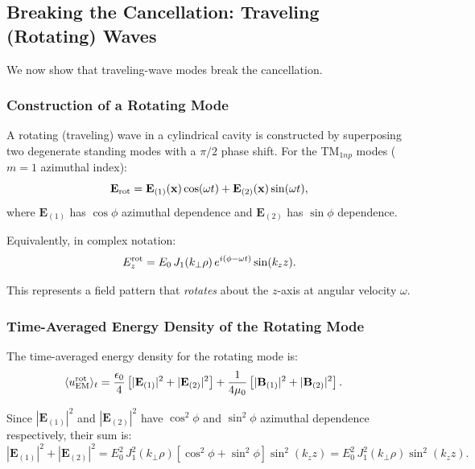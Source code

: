 \documentclass[aps,prd,twocolumn,superscriptaddress,floatfix,nofootinbib]{revtex4-2}
\begin{document}
\subsection{Breaking the Cancellation: Traveling (Rotating) Waves}
\label{sec:traveling-wave}

We now show that traveling-wave modes break the cancellation.

\subsubsection{Construction of a Rotating Mode}

A rotating (traveling) wave in a cylindrical cavity is constructed
by superposing two degenerate standing modes with a $\pi/2$ phase
shift. For the TM$_{1np}$ modes ($m = 1$ azimuthal index):
\begin{equation}
\mathbf{E}_{\rm rot} = \mathbf{E}_{(1)}(\mathbf{x})\cos(\omega t)
+ \mathbf{E}_{(2)}(\mathbf{x})\sin(\omega t),
\label{eq:rotating-mode}
\end{equation}
where $\mathbf{E}_{(1)}$ has $\cos\phi$ azimuthal dependence and
$\mathbf{E}_{(2)}$ has $\sin\phi$ dependence.

Equivalently, in complex notation:
\begin{equation}
E_z^{\rm rot} = E_0\,J_1(k_\perp\rho)\,e^{i(\phi - \omega t)}
\sin(k_z z).
\end{equation}

This represents a field pattern that \emph{rotates} about the
$z$-axis at angular velocity $\omega$.

\subsubsection{Time-Averaged Energy Density of the Rotating Mode}

The time-averaged energy density for the rotating mode is:
\begin{align}
\langle u_{\rm EM}^{\rm rot}\rangle_t
&= \frac{\epsilon_0}{4}\left[
|\mathbf{E}_{(1)}|^2 + |\mathbf{E}_{(2)}|^2\right]
+ \frac{1}{4\mu_0}\left[
|\mathbf{B}_{(1)}|^2 + |\mathbf{B}_{(2)}|^2\right].
\label{eq:uEM-rot}
\end{align}

Since $|\mathbf{E}_{(1)}|^2$ and $|\mathbf{E}_{(2)}|^2$ have
$\cos^2\phi$ and $\sin^2\phi$ azimuthal dependence respectively,
their sum is:
\begin{equation}
|\mathbf{E}_{(1)}|^2 + |\mathbf{E}_{(2)}|^2
= E_0^2\,J_1^2(k_\perp\rho)
\left[\cos^2\phi + \sin^2\phi\right]\sin^2(k_z z)
= E_0^2\,J_1^2(k_\perp\rho)\sin^2(k_z z).
\end{equation}
\end{document}
